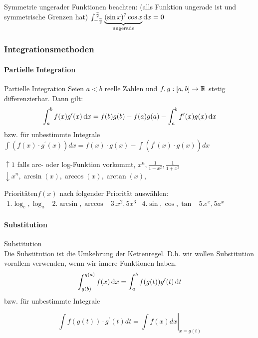 Symmetrie ungerader Funktionen beachten: (alls Funktion ungerade ist und symmetrische Grenzen hat)
$\int_{-\frac{\pi}{2}}^{\frac{\pi}{2}} \underbrace{(\sin x)^7 \cos x}_{\text{ungerade}} \dif x = 0$


\subsubsection{Integrationsmethoden}
\paragraph{Partielle Integration}

\begin{concept}{Partielle Integration}
	Seien $a < b$ reelle Zahlen und $f,g:[a,b] \to \mathbb{R}$ stetig differenzierbar. Dann gilt:
   \begin{equation*}
	   \int_a^b f(x) g'(x) \dif x = f(b) g(b) - f(a) g(a) - \int_a^b f'(x)g(x) \dif x
   \end{equation*}
   bzw. für unbestimmte Integrale\\

   $
   \int\left(f(x) \cdot g^{\prime}(x)\right) d x=f(x) \cdot g(x)-\int\left(f^{\prime}(x) \cdot g(x)\right) d x
   $
\end{concept}
\begin{remark}
   $\uparrow 1$ falls arc- oder log-Funktion vorkommt, $x^{n}, \frac{1}{1-x^{2}}, \frac{1}{1+x^{2}}$\\

   $\downarrow x^{n}, \arcsin (x), \arccos (x), \arctan (x)$,
\end{remark}
\begin{KR}{Prioritäten}$f(x)$ nach folgender Priorität auswählen:\\
   $
   \begin{array}{lllll}
	   1. \log_e, \log_a  & 2. \arcsin, \arccos &  3. x^2, 5x^3 & 4. \sin, \cos, \tan & 5. e^x, 5a^x
   \end{array}
   $
\end{KR}

\paragraph*{Substitution}

\begin{concept}{Substitution}\\
    Die Substitution ist die Umkehrung der Kettenregel. D.h. wir wollen Substitution vorallem verwenden, wenn wir innere Funktionen haben.
    \begin{equation*}
        \int_{g(b)}^{g(a)} f(x) \dif x = \int_{a}^b f(g(t)) g'(t) \dif t
    \end{equation*}
    bzw. für unbestimmte Integrale

    $$
    \int f(g(t)) \cdot g^{\prime}(t) d t=\left.\int f(x) d x\right|_{x=g(t)}
    $$
\end{concept}




